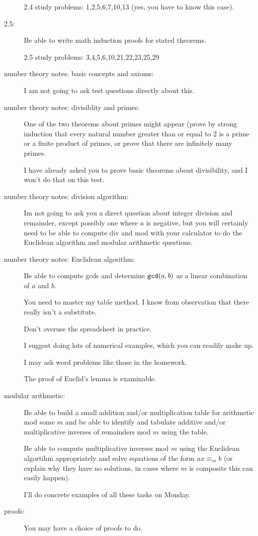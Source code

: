 \documentclass[12pt]{article}
\begin{document}
\begin{description}
2.4 study problems:  1,2,5,6,7,10,13 (yes, you have to know this case).

\item[2.5:]  Be able to write math induction proofs for stated theorems.  

2.5 study problems:  3,4,5,6,10,21,22,23,25,29

\item[number theory notes:  basic concepts and axioms:]  I am not going to ask test questions directly about this.

\item[number theory notes:  divisiblity and primes:]  One of the two theorems about primes might appear (prove by strong induction that every natural number greater than or equal to 2 is a prime or a finite product of primes, or prove that there are infinitely many primes.

I have already asked you to prove basic theorems about divisibility, and I won't do that on this test.

\item[number theory notes:  division algorithm:]  Im not going to ask you a direct question about integer division and remainder, except possibly one where $a$ is negative, but you will certainly need to be able to compute div and mod with your calculator to do the Euclidean algorithm and modular arithmetic questions.

\item[number theory notes:  Euclidean algorithm:]  Be able to compute gcds and determine ${\tt gcd}(a,b)$ as a linear combination of $a$ and $b$.

You need to master my table method.  I know from observation that there really isn't a substitute.

Don't overuse the spreadsheet in practice.

I suggest doing lots of numerical examples, which you can readily make up.

I may ask word problems like those in the homework.

The proof of Euclid's lemma is examinable.

\item[modular arithmetic:]  Be able to build a small addition and/or multiplication table for arithmetic mod some $m$ and be able to identify and tabulate
additive and/or multiplicative inverses of remainders mod $m$ using the table.

Be able to compute multiplicative inverses mod $m$ using the Euclidean algortihm appropriately and solve equations of the form $ax \equiv_m b$ (or explain why they have no solutions, in cases where $m$ is composite this can easily happen).

I'll do concrete examples of all these tasks on Monday.

\item[proofs:]  You may have a choice of proofs to do.


\end{description}
\end{document}
